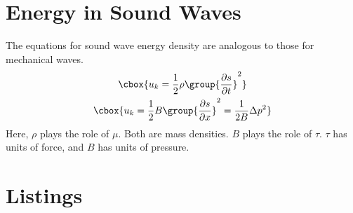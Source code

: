 \documentclass{hw}
\numberwithin{equation}{section}
\begin{document}
\section{Energy in Sound Waves}
The equations for sound wave energy density are analogous to those for
mechanical waves.
\begin{gather}
  \cbox{u_k = \frac{1}{2} \rho \group{\frac{\partial s}{\partial t}}^2} \\
  \cbox{u_k = \frac{1}{2} B    \group{\frac{\partial s}{\partial x}}^2
            = \frac{1}{2B} \Delta p^2}
\end{gather}
Here, $\rho$ plays the role of $\mu$. Both are mass densities. $B$ plays the
role of $\tau$. $\tau$ has units of force, and $B$ has units of pressure.



\section{Listings}
\end{document}
